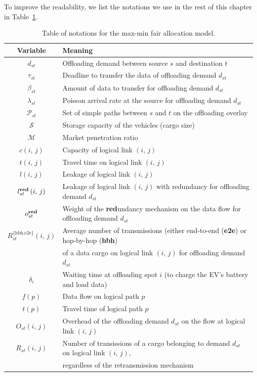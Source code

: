 To improve the readability, we list the notations we use in the rest of this chapter in Table~\ref{tab:main-variables-haulage}. 

\begin{table}[ht]
    \caption{Table of notations for the max-min fair allocation model.}
    \renewcommand{\arraystretch}{1.1}
    \centering
    {\footnotesize
    \begin{tabular}{c|l}
        \textbf{Variable} & \textbf{Meaning}\tabularnewline
        \hline 
        $d_{st}$ & Offloading demand between source $s$ and destination $t$\tabularnewline
        $\tau_{st}$ & Deadline to transfer the data of offloading demand $d_{st}$\tabularnewline
        $\beta_{st}$ & Amount of data to transfer for offloading demand $d_{st}$\tabularnewline
        $\lambda_{st}$ & Poisson arrival rate at the source for offloading demand $d_{st}$\tabularnewline
        $\mathcal{P}_{st}$ & Set of simple paths between $s$ and $t$ on the offloading overlay\tabularnewline
        $\mathcal{S}$ & Storage capacity of the vehicles (cargo size)\tabularnewline
        $\mathcal{M}$ & Market penetration ratio\tabularnewline
        $c\left(i,\, j\right)$ & Capacity of logical link $\left(i,\, j\right)$\tabularnewline
        $t\left(i,\, j\right)$ & Travel time on logical link $\left(i,\, j\right)$\tabularnewline
        $l\left(i,\, j\right)$ & Leakage of logical link $\left(i,\, j\right)$\tabularnewline
        $l^{\textrm{\textbf{red}}}_{st}\left(i,\, j\right)$ & Leakage of logical link $\left(i,\, j\right)$ with redundancy for offloading demand $d_{st}$\tabularnewline
        $o^{\textrm{\textbf{red}}}_{st}$ & Weight of the \textbf{red}undancy mechanism on the data flow for offloading demand $d_{st}$\tabularnewline
        $R^{\{\textrm{hbh,e2e}\}}_{st}(i,\,j)$ & Average number of transmissions (either end-to-end (\textbf{e2e}) or hop-by-hop (\textbf{hbh}) \\
         & of a data cargo on logical link $(i,\,j)$ for offloading demand $d_{st}$\tabularnewline
        $\delta_{i}$ & Waiting time at offloading spot $i$ (to charge the EV's battery and load data)\tabularnewline
        $f\left(p\right)$ & Data flow on logical path $p$\tabularnewline
        $t\left(p\right)$ & Travel time of logical path $p$\tabularnewline
        $O_{st}(i,\,j)$ & Overhead of the offloading demand $d_{st}$ on the flow at logical link $(i,\,j)$\tabularnewline
        $R_{st}(i,\,j)$ & Number of transissions of a cargo belonging to demand $d_{st}$ on logical link $(i,\,j)$, \\
         & regardless of the retransmission mechanism\tabularnewline
    \end{tabular}}
    \label{tab:main-variables-haulage}
\end{table}

